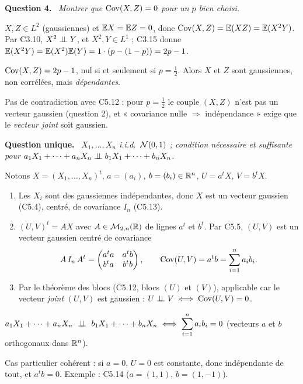 \documentclass[11pt,a4paper]{article}
\newcommand{\question}[1]{\par\medskip\noindent\textbf{Question #1.}~}
\begin{document}
\begin{exo}[$Z=XY$ : gaussienne sans vecteur gaussien]
\question{4} \emph{Montrer que $\operatorname{Cov}(X,Z)=0$ pour un $p$ bien choisi.}

$X,Z\in L^2$ (gaussiennes) et $\mathbb{E} X=\mathbb{E} Z=0$, donc $\operatorname{Cov}(X,Z)=\mathbb{E}(XZ)=\mathbb{E}(X^2Y)$. Par C3.10, $X^2\perp\!\!\!\perp Y$, et $X^2,Y\in L^1$ ;
C3.15 donne $\mathbb{E}(X^2Y)=\mathbb{E}(X^2)\mathbb{E}(Y)=1\cdot(p-(1-p))=2p-1$.
\begin{resultat}
$\operatorname{Cov}(X,Z)=2p-1$, nul si et seulement si $p=\frac12$. Alors $X$ et $Z$ sont gaussiennes, non corrélées, mais \emph{dépendantes}.
\end{resultat}
Pas de contradiction avec C5.12 : pour $p=\frac12$ le couple $(X,Z)$ n'est pas un vecteur gaussien (question 2), et « covariance nulle
$\Rightarrow$ indépendance » exige que le \emph{vecteur joint} soit gaussien.
\end{exo}

\begin{exo}

\question{unique} \emph{$X_1,\dots,X_n$ i.i.d.\ $\mathcal{N}(0,1)$ ; condition nécessaire et suffisante pour $a_1X_1+\dots+a_nX_n\perp\!\!\!\perp b_1X_1+\dots+b_nX_n$.}

Notons $X=(X_1,\dots,X_n)^t$, $a=(a_i)$, $b=(b_i)\in\mathbb{R}^n$, $U=a^tX$, $V=b^tX$.
\begin{enumerate}
  \item Les $X_i$ sont des gaussiennes indépendantes, donc $X$ est un vecteur gaussien (C5.4), centré, de covariance $I_n$ (C5.13).
  \item $(U,V)^t=AX$ avec $A\in\mathcal M_{2,n}(\mathbb{R})$ de lignes $a^t$ et $b^t$. Par C5.5, $(U,V)$ est un vecteur gaussien centré de covariance
  \[A\,I_n\,A^t=\begin{pmatrix}a^ta&a^tb\\b^ta&b^tb\end{pmatrix},\qquad\operatorname{Cov}(U,V)=a^tb=\sum_{i=1}^na_ib_i .\]
  \item Par le théorème des blocs (C5.12, blocs $(U)$ et $(V)$), applicable car le vecteur \emph{joint} $(U,V)$ est gaussien :
  $U\perp\!\!\!\perp V\iff\operatorname{Cov}(U,V)=0$.
\end{enumerate}
\begin{resultat}
$\displaystyle a_1X_1+\dots+a_nX_n\ \indep\ b_1X_1+\dots+b_nX_n\iff\sum_{i=1}^na_ib_i=0$ (vecteurs $a$ et $b$ orthogonaux dans $\mathbb{R}^n$).
\end{resultat}
Cas particulier cohérent : si $a=0$, $U=0$ est constante, donc indépendante de tout, et $a^tb=0$. Exemple : C5.14 ($a=(1,1)$, $b=(1,-1)$).
\end{exo}
\end{document}
